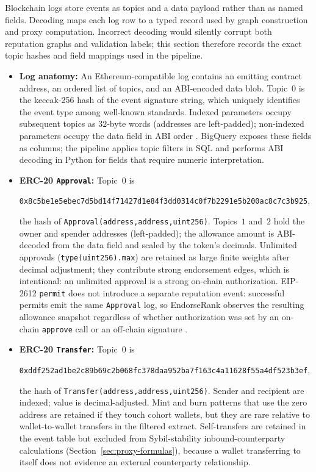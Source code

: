 
Blockchain logs store events as topics and a data payload rather than as named fields. Decoding maps each log row to a typed record used by graph construction and proxy computation. Incorrect decoding would silently corrupt both reputation graphs and validation labels; this section therefore records the exact topic hashes and field mappings used in the pipeline.

\begin{itemize}
\item \textbf{Log anatomy:} An Ethereum-compatible log contains an emitting contract address, an ordered list of topics, and an ABI-encoded data blob. Topic~$0$ is the keccak-256 hash of the event signature string, which uniquely identifies the event type among well-known standards. Indexed parameters occupy subsequent topics as $32$-byte words (addresses are left-padded); non-indexed parameters occupy the data field in ABI order . BigQuery exposes these fields as columns; the pipeline applies topic filters in SQL and performs ABI decoding in Python for fields that require numeric interpretation.

\item \textbf{ERC-20 \texttt{Approval}:} Topic~$0$ is
\begin{center}
\texttt{0x8c5be1e5ebec7d5bd14f71427d1e84f3dd0314c0f7b2291e5b200ac8c7c3b925},
\end{center}
the hash of \texttt{Approval(address,address,uint256)}. Topics~$1$ and~$2$ hold the owner and spender addresses (left-padded); the allowance amount is ABI-decoded from the data field and scaled by the token's decimals. Unlimited approvals (\texttt{type(uint256).max}) are retained as large finite weights after decimal adjustment; they contribute strong endorsement edges, which is intentional: an unlimited approval is a strong on-chain authorization. EIP-2612 \texttt{permit} does not introduce a separate reputation event: successful permits emit the same \texttt{Approval} log, so EndorseRank observes the resulting allowance snapshot regardless of whether authorization was set by an on-chain \texttt{approve} call or an off-chain signature .

\item \textbf{ERC-20 \texttt{Transfer}:} Topic~$0$ is
\begin{center}
\texttt{0xddf252ad1be2c89b69c2b068fc378daa952ba7f163c4a11628f55a4df523b3ef},
\end{center}
the hash of \texttt{Transfer(address,address,uint256)}. Sender and recipient are indexed; value is decimal-adjusted. Mint and burn patterns that use the zero address are retained if they touch cohort wallets, but they are rare relative to wallet-to-wallet transfers in the filtered extract. Self-transfers are retained in the event table but excluded from Sybil-stability inbound-counterparty calculations (Section~\ref{sec:proxy-formulas}), because a wallet transferring to itself does not evidence an external counterparty relationship.


\end{itemize}
